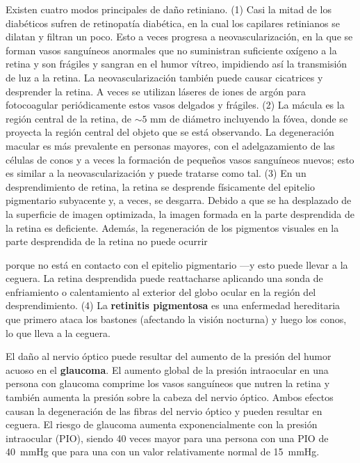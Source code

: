 \documentclass[12pt]{book}
\begin{document}
Existen cuatro modos principales de daño retiniano. (1) Casi la mitad de los diabéticos sufren de retinopatía diabética, en la cual los capilares retinianos se dilatan y filtran un poco. Esto a veces progresa a neovascularización, en la que se forman vasos sanguíneos anormales que no suministran suficiente oxígeno a la retina y son frágiles y sangran en el humor vítreo, impidiendo así la transmisión de luz a la retina. La neovascularización también puede causar cicatrices y desprender la retina. A veces se utilizan láseres de iones de argón para fotocoagular periódicamente estos vasos delgados y frágiles. (2) La mácula es la región central de la retina, de $\sim 5\text{ mm}$ de diámetro incluyendo la fóvea, donde se proyecta la región central del objeto que se está observando. La degeneración macular es más prevalente en personas mayores, con el adelgazamiento de las células de conos y a veces la formación de pequeños vasos sanguíneos nuevos; esto es similar a la neovascularización y puede tratarse como tal. (3) En un desprendimiento de retina, la retina se desprende físicamente del epitelio pigmentario subyacente y, a veces, se desgarra. Debido a que se ha desplazado de la superficie de imagen optimizada, la imagen formada en la parte desprendida de la retina es deficiente. Además, la regeneración de los pigmentos visuales en la parte desprendida de la retina no puede ocurrir


porque no está en contacto con el epitelio pigmentario ---y esto puede llevar a la ceguera. La retina desprendida puede reattacharse aplicando una sonda de enfriamiento o calentamiento al exterior del globo ocular en la región del desprendimiento. (4) La \textbf{retinitis pigmentosa} es una enfermedad hereditaria que primero ataca los bastones (afectando la visión nocturna) y luego los conos, lo que lleva a la ceguera.

El daño al nervio óptico puede resultar del aumento de la presión del humor acuoso en el \textbf{glaucoma}. El aumento global de la presión intraocular en una persona con glaucoma comprime los vasos sanguíneos que nutren la retina y también aumenta la presión sobre la cabeza del nervio óptico. Ambos efectos causan la degeneración de las fibras del nervio óptico y pueden resultar en ceguera. El riesgo de glaucoma aumenta exponencialmente con la presión intraocular (PIO), siendo 40 veces mayor para una persona con una PIO de 40~mmHg que para una con un valor relativamente normal de 15~mmHg.
\end{document}
